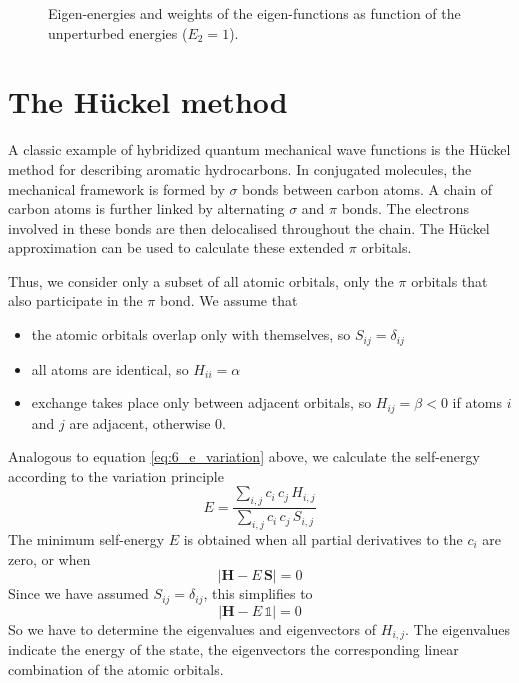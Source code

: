 \begin{figure}
\caption{Eigen-energies and weights of the eigen-functions as function of the unperturbed energies ($E_2 = 1$).}
\label{fig:6_anticrossing}
\end{figure}








\section{The Hückel method}

A classic example of hybridized quantum mechanical wave functions is the Hückel method for describing aromatic hydrocarbons.
 In conjugated molecules, the mechanical framework is formed by $\sigma$ bonds between carbon atoms. A chain of carbon atoms is further linked by alternating $\sigma$ and $\pi$ bonds. The electrons involved in these bonds are then delocalised throughout the chain. The Hückel approximation can be used to calculate these extended $\pi$ orbitals.

Thus, we consider only a subset of all atomic orbitals, only the $\pi$ orbitals that also participate in the $\pi$ bond. We assume that
\begin{itemize} \setlength{\itemsep}{0pt}
\item the atomic orbitals overlap only with themselves, so $S_{ij} = \delta_{ij}$
\item all atoms are identical, so $H_{ii} = \alpha$
\item exchange takes place only between adjacent orbitals, so $H_{ij} = \beta < 0 $ if atoms $i$ and $j$ are adjacent, otherwise $0$. 
\end{itemize}

Analogous to equation \ref{eq:6_e_variation} above, we calculate the self-energy according to the variation principle
\begin{equation}
 E = \frac{ \sum_{i,j} c_i \, c_j \, H_{i,j} }{ \sum_{i,j} c_i \, c_j \, S_{i,j} }
\end{equation}
The minimum self-energy $E$ is obtained when all partial derivatives to the $c_i$ are zero, or when
\begin{equation}
 \left| \mathbf{H} - E \, \mathbf{S}\right| = 0
\end{equation}
Since we have assumed $S_{ij} = \delta_{ij}$, this simplifies to 
\begin{equation}
 \left| \mathbf{H} - E \, \mathds{1} \right| = 0
\end{equation}
So we have to determine the eigenvalues and eigenvectors of $H_{i,j}$. The eigenvalues indicate the energy of the state, the eigenvectors the corresponding linear combination of the atomic orbitals.

